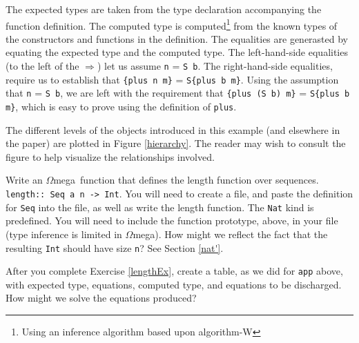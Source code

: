 \documentclass[11pt,twoside,A4]{llncs}
\newcommand{\om}{\emph{$\Omega$}mega}
\begin{document}
\noindent
The expected types are taken from the type declaration accompanying the
function definition. The computed type is computed\footnote{Using an inference
algorithm based upon algorithm-W} from the known types of the constructors and functions in the
definition. The equalities are generasted by equating the expected type
and the computed type. The left-hand-side equalities (to the left of the
$\Rightarrow$) let us assume
\verb+n+ = \verb+S b+. The right-hand-side equalities, require us to
establish that \verb+{plus n m}+ = \verb+S{plus b m}+.   Using the
assumption that \verb+n+ = \verb+S b+, we are left with the requirement
that \verb+{plus (S b) m}+ = \verb+S{plus b m}+, which is easy to prove
using the definition of \verb+plus+.
 
The different levels of the objects introduced in this example (and elsewhere
in the paper) are plotted in Figure \ref{hierarchy}. The reader may wish
to consult the figure to help visualize the relationships involved.

\begin{exercise} \label{lengthEx}

Write an \om\ function that defines the length function over sequences.
\verb+length:: Seq a n -> Int+. You will need to create a file, and paste the
definition for {\tt Seq} into the file, as well as write the length function.
The {\tt Nat} kind is predefined. You will need to include the function
prototype, above, in your file (type inference is limited in \om). How might we
reflect the fact that the resulting {\tt Int} should have size {\tt n}? See
Section \ref{nat'}.

\end{exercise}

\begin{exercise}
After you complete Exercise \ref{lengthEx}, create a table,
as we did for {\tt app} above, with expected type, equations, computed type,
and equations to be discharged. How might we solve the equations produced?
\end{exercise}

\renewcommand{\textfraction}{0.1}
\renewcommand{\topfraction}{.80}
 
\end{document}
